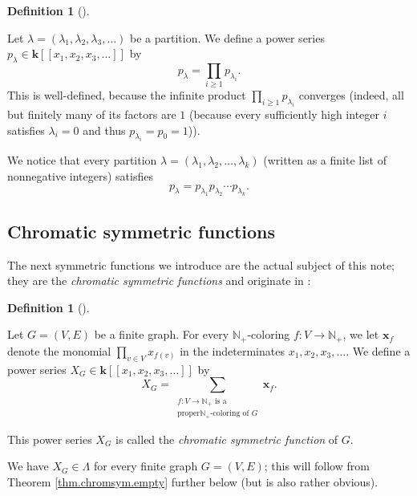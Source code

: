 \documentclass[numbers=enddot,12pt,final,onecolumn,notitlepage]{scrartcl}%
\theoremstyle{definition}
\newtheorem{defi}[theo]{Definition}
\newenvironment{definition}[1][]
{\begin{defi}[#1]\begin{leftbar}}
{\end{leftbar}\end{defi}}
\let\sumnonlimits\sum
\let\prodnonlimits\prod
\renewcommand{\sum}{\sumnonlimits\limits}
\renewcommand{\prod}{\prodnonlimits\limits}
\begin{document}
\begin{definition}
\label{def.powersum2}Let $\lambda=\left(  \lambda_{1},\lambda_{2},\lambda
_{3},\ldots\right)  $ be a partition. We define a power series $p_{\lambda}%
\in\mathbf{k}\left[  \left[  x_{1},x_{2},x_{3},\ldots\right]  \right]  $ by%
\[
p_{\lambda}=\prod_{i\geq1}p_{\lambda_{i}}.
\]
This is well-defined, because the infinite product $\prod_{i\geq1}%
p_{\lambda_{i}}$ converges (indeed, all but finitely many of its factors are
$1$ (because every sufficiently high integer $i$ satisfies $\lambda_{i}=0$ and
thus $p_{\lambda_{i}}=p_{0}=1$)).
\end{definition}

We notice that every partition $\lambda=\left(  \lambda_{1},\lambda_{2}%
,\ldots,\lambda_{k}\right)  $ (written as a finite list of nonnegative
integers) satisfies%
\begin{equation}
p_{\lambda}=p_{\lambda_{1}}p_{\lambda_{2}}\cdots p_{\lambda_{k}}.
\label{eq.def.powersum2.finite-expression}%
\end{equation}


\subsection{Chromatic symmetric functions}

The next symmetric functions we introduce are the actual subject of this note;
they are the \textit{chromatic symmetric functions} and originate in
\cite[Definition 2.1]{Stanley-chsym}:

\begin{definition}
\label{def.chromsym}Let $G=\left(  V,E\right)  $ be a finite graph. For every
$\mathbb{N}_{+}$-coloring $f:V\rightarrow\mathbb{N}_{+}$, we let
$\mathbf{x}_{f}$ denote the monomial $\prod_{v\in V}x_{f\left(  v\right)  }$
in the indeterminates $x_{1},x_{2},x_{3},\ldots$. We define a power series
$X_{G}\in\mathbf{k}\left[  \left[  x_{1},x_{2},x_{3},\ldots\right]  \right]  $
by%
\[
X_{G}=\sum_{\substack{f:V\rightarrow\mathbb{N}_{+}\text{ is a}\\\text{proper
}\mathbb{N}_{+}\text{-coloring of }G}}\mathbf{x}_{f}.
\]


This power series $X_{G}$ is called the \textit{chromatic symmetric function}
of $G$.
\end{definition}

We have $X_{G}\in\Lambda$ for every finite graph $G=\left(  V,E\right)  $;
this will follow from Theorem \ref{thm.chromsym.empty} further below (but is
also rather obvious).
\end{document}
